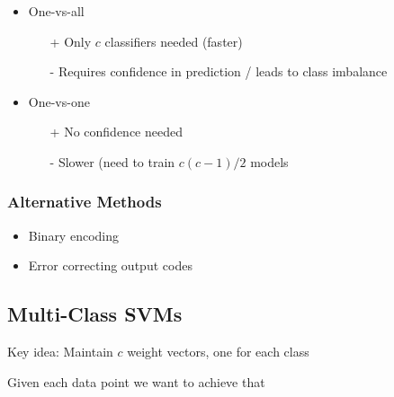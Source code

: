 \documentclass[10pt,a4paper]{scrartcl}
\begin{document}
\begin{multicols*}{2}
\begin{itemize}
\item One-vs-all
\begin{itemize}
\item[+] Only $c$ classifiers needed (faster)
\item[-] Requires confidence in prediction / leads to class imbalance
\end{itemize}
\item One-vs-one
\begin{itemize}
\item[+] No confidence needed
\item[-] Slower (need to train $c(c-1)/2$ models
\end{itemize}
\end{itemize}

\subsubsection{Alternative Methods}

\begin{itemize}
\item Binary encoding
\item Error correcting output codes
\end{itemize}

\subsection{Multi-Class SVMs}

Key idea: Maintain $c$ weight vectors, one for each class


Given each data point we want to achieve that





\end{multicols*}
\end{document}
